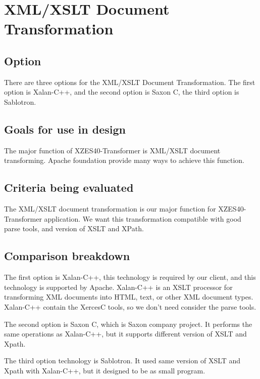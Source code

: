 \section{XML/XSLT Document Transformation}

\subsection{Option}

There are three options for the XML/XSLT Document Transformation.
The first option is Xalan-C++, and the second option is Saxon C, the third option is Sablotron.

\subsection{Goals for use in design}

The major function of XZES40-Transformer is XML/XSLT document transforming.
Apache foundation provide many ways to achieve this function.

\subsection{Criteria being evaluated}

The XML/XSLT document transformation is our major function for XZES40-Transformer application.
We want this transformation compatible with good parse tools, and version of XSLT and XPath.

\subsection{Comparison breakdown}

The first option is Xalan-C++, this technology is required by our client, and this technology is supported by Apache.
Xalan-C++ is an XSLT processor for transforming XML documents into HTML, text, or other XML document types.
Xalan-C++ contain the XercesC tools, so we don't need consider the parse tools.

The second option is Saxon C, which is Saxon company project.
It performs the same operations as Xalan-C++, but it supports different version of XSLT and Xpath.

The third option technology is Sablotron.
It used same version of XSLT and Xpath with Xalan-C++, but it designed to be as small program.

